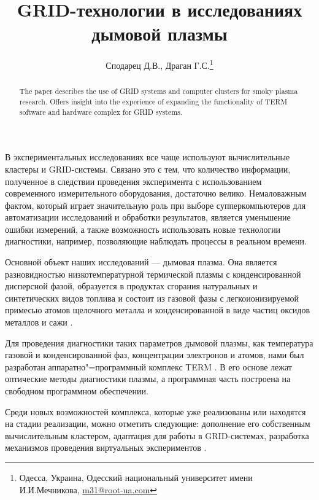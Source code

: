 \documentclass[10pt, a5paper]{article}
\begin{document}
\title{GRID-технологии в исследованиях дымовой плазмы}
\author{Сподарец Д.В., Драган Г.С.\footnote{Одесса, Украина, Одесский национальный университет имени И.И.Мечникова, \url{m31@root-ua.com}}}
\date{}
\maketitle
\begin{abstract}
The paper describes the use of GRID systems and computer clusters for smoky plasma research. Offers insight into the experience of expanding the functionality of TERM software and hardware complex for GRID systems.
\end{abstract}
В экспериментальных исследованиях все чаще используют  вычислительные кластеры и GRID-системы. Связано это с тем, что количество информации, полученное в следствии проведения эксперимента с использованием современного измерительного оборудования, достаточно велико. Немаловажным фактом, который играет значительную роль при выборе супперкомпьютеров для автоматизации исследований и обработки результатов, является уменьшение ошибки измерений, а также возможность использовать новые технологии диагностики, например, позволяющие наблюдать процессы в реальном времени.

Основной объект наших исследований --- дымовая плазма. Она является разновидностью низкотемпературной термической плазмы с конденсированной дисперсной фазой, образуется в продуктах сгорания натуральных и синтетических видов топлива и состоит из газовой фазы с легкоионизируемой примесью атомов щелочного металла и конденсированной в виде частиц оксидов металлов и сажи \cite{spod1}.

Для проведения диагностики таких параметров дымовой плазмы, как температура газовой и конденсированной фаз, концентрации электронов и атомов, нами был разработан аппаратно"=программный комплекс TERM \cite{spod2}. В его основе лежат оптические методы диагностики плазмы, а программная часть построена на свободном программном обеспечении. 

Среди новых возможностей комплекса, которые уже реализованы или находятся на стадии реализации, можно отметить следующие: дополнение его собственным вычислительным кластером, адаптация для работы в GRID-системах, разработка механизмов проведения виртуальных экспериментов \cite{spod3}.
\end{document}
